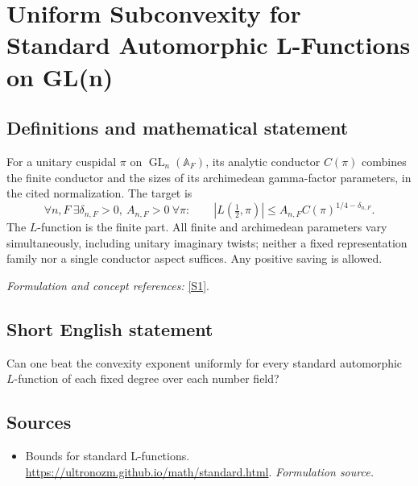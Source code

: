 \documentclass[11pt]{article}
\begin{document}
\section*{\texorpdfstring{Uniform Subconvexity for Standard Automorphic L-Functions on GL(n)}{Uniform Subconvexity for Standard Automorphic L-Functions on GL(n)}}\label{147}
\subsection{Definitions and mathematical statement}
For a unitary cuspidal $\pi$ on $\operatorname{GL}_n({\mathbb{A}}_F)$, its analytic conductor $C(\pi)$ combines the finite conductor and the sizes of its archimedean gamma-factor parameters, in the cited normalization. The target is
\[
 \forall n,F\ \exists\delta_{n,F}>0,\ A_{n,F}>0\ \forall\pi:\qquad
 |L(\tfrac12,\pi)|\le A_{n,F}C(\pi)^{1/4-\delta_{n,F}}.
\]
The $L$-function is the finite part. All finite and archimedean parameters vary simultaneously, including unitary imaginary twists; neither a fixed representation family nor a single conductor aspect suffices. Any positive saving is allowed.
\par\smallskip\textit{Formulation and concept references:} \href{https://ultronozm.github.io/math/standard.html}{[S1]}.

\subsection{Short English statement}
Can one beat the convexity exponent uniformly for every standard automorphic $L$-function of each fixed degree over each number field?
\subsection{Sources}
\begin{itemize}
\item[S1]Bounds for standard L-functions.
\url{https://ultronozm.github.io/math/standard.html}.
\textit{Formulation source.}
\end{itemize}
\end{document}
